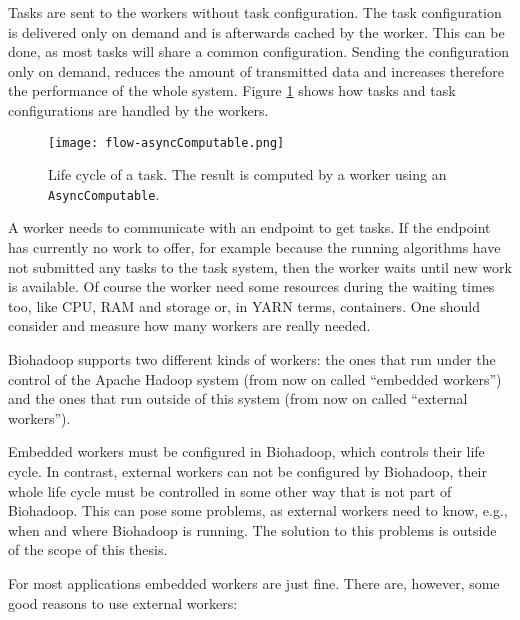 Tasks are sent to the workers without task configuration. The task configuration is delivered only on demand and is afterwards cached by the worker. This can be done, as most tasks will share a common configuration. Sending the configuration only on demand, reduces the amount of transmitted data and increases therefore the performance of the whole system. Figure \ref{fig:async-computable} shows how tasks and task configurations are handled by the workers.

\begin{figure}
  \centering
  \texttt{[image: flow-asyncComputable.png]}
  \caption[Life cycle of a task]{Life cycle of a task. The result is computed by a worker using an \texttt{AsyncComputable}.}
  \label{fig:async-computable}
\end{figure}

A worker needs to communicate with an endpoint to get tasks. If the endpoint has currently no work to offer, for example because the running algorithms have not submitted any tasks to the task system, then the worker waits until new work is available. Of course the worker need some resources during the waiting times too, like CPU, RAM and storage or, in YARN terms, containers. One should consider and measure how many workers are really needed.

Biohadoop supports two different kinds of workers: the ones that run under the control of the Apache Hadoop system (from now on called ``embedded workers'') and the ones that run outside of this system (from now on called ``external workers'').

Embedded workers must be configured in Biohadoop, which controls their life cycle. In contrast, external workers can not be configured by Biohadoop, their whole life cycle must be controlled in some other way that is not part of Biohadoop. This can pose some problems, as external workers need to know, e.g., when and where Biohadoop is running. The solution to this problems is outside of the scope of this thesis.

For most applications embedded workers are just fine. There are, however, some good reasons to use external workers:

